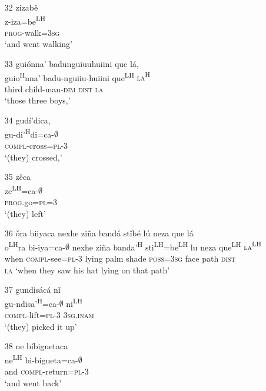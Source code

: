 \begin{itemize}
\item[32]
\glll zizab\v{e}\\
z-iza=be\textsuperscript{LH}\\
\textsc{prog}-walk=\textsc{3sg}\\
\glt `and went walking'


\item[33]
\glll gui\'{o}nna' badunguiuuhuiini que l\'{a},\\
guio\textsuperscript{H}nna' badu-nguiiu-huiini que\textsuperscript{LH} \textsc{la\textsuperscript{H}}\\
third child-man-\textsc{dim} \textsc{dist} \textsc{la}\\
\glt `those three boys,'


\item[34]
\glll gud\'{i}'dica,\\
gu-di'\textsuperscript{H}di=ca-$\emptyset$\\
\textsc{compl}-cross=\textsc{pl}-\textsc{3}\\
\glt `(they) crossed,'


\item[35]
\glll z\v{e}ca\\
ze\textsuperscript{LH}=ca-$\emptyset$\\
\textsc{prog}.go=\textsc{pl}=\textsc{3}\\
\glt `(they) left'
 

\item[36]
\glll \v{o}ra biiyaca nexhe zi\~{n}a band\'{a} st\v{i}b\'{e} l\'{u} neza que l\'{a}\\
o\textsuperscript{LH}ra bi-iya=ca-$\emptyset$ nexhe zi\~{n}a banda'\textsuperscript{H} sti\textsuperscript{LH}=be\textsuperscript{LH} lu neza que\textsuperscript{LH} \textsc{la\textsuperscript{LH}}\\
when \textsc{compl}-see=\textsc{pl}-\textsc{3} lying palm shade \textsc{poss}=\textsc{3sg} face path \textsc{dist}\\\textsc{la}
\glt `when they saw his hat lying on that path'


\item[37]
\glll gundis\'{a}c\'{a} n\v{i}\\
gu-ndisa'\textsuperscript{H}=ca-$\emptyset$ ni\textsuperscript{LH}\\
\textsc{compl}-lift=\textsc{pl}-\textsc{3} \textsc{3sg.inam}\\
\glt `(they) picked it up'


\item[38]
\glll ne b\'{i}biguetaca\\
ne\textsuperscript{LH} bi-bigueta=ca-$\emptyset$\\
and \textsc{compl}-return=\textsc{pl}-\textsc{3}\\
\glt `and went back'



\end{itemize}
